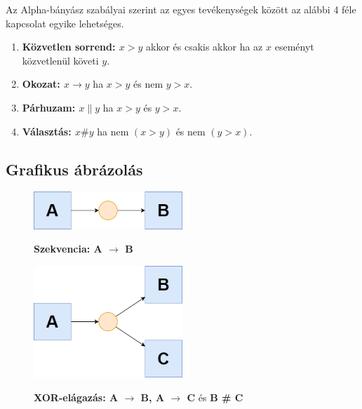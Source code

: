 Az Alpha-bányász szabályai szerint az egyes tevékenységek között az alábbi 4 féle kapcsolat egyike lehetséges.
\begin{enumerate}
\item \textbf{Közvetlen sorrend: $x > y$} akkor és csakis akkor ha az $x$ eseményt közvetlenül követi $y$.
\item \textbf{Okozat: $x \rightarrow y$} ha $x > y$ és nem $y > x$.
\item \textbf{Párhuzam: $x \parallel y$} ha $x > y$ és $y > x$.
\item \textbf{Választás: $x \# y$} ha nem $(x > y)$ és nem $(y > x)$.
\end{enumerate}

\subsection{Grafikus ábrázolás}

\vfill

\begin{figure}[h!]
\begin{center}
\includegraphics[width=0.5\textwidth,keepaspectratio=true]{images/img_alpha_seq}\\
\caption{\textbf{Szekvencia: A $\rightarrow$ B}}
\label{fig:example}
\end{center}
\end{figure}

\vfill

\begin{figure}[h!]
\begin{center}
\includegraphics[width=0.5\textwidth,keepaspectratio=true]{images/img_alpha_xor}\\
\caption{\textbf{XOR-elágazás: A $\rightarrow$ B, A $\rightarrow$ C} és \textbf{B \# C}}
\label{fig:example}
\end{center}
\end{figure}

